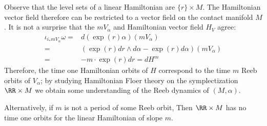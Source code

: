 
 

Observe that the level sets of a linear Hamiltonian are  $\{r\}\times M$. The Hamiltonian vector field therefore can be restricted to a vector field on the contact manifold $M$. It is not a surprise that the $m V_\alpha$ and Hamiltonian vector field $H_V$ agree:
\begin{align*}
    \iota_{i_* m V_\alpha}\omega=& d(\exp(r) \alpha )(m V_\alpha)\\
     =&(\exp(r) dr \wedge d\alpha - \exp(r) d\alpha) (m V_\alpha)\\
    =&- m \cdot \exp(r)dr = dH^m
\end{align*}
Therefore, the time one Hamiltonian orbits of $H$ correspond to the time $m$ Reeb orbits of $V_\alpha$; by studying Hamiltonian Floer theory on the symplectization $\RR\times M$ we obtain some understanding of the Reeb dynamics of $(M, \alpha)$.

Alternatively, if $m$ is not a period of some Reeb orbit, Then $\RR\times M$ has no time one orbits for the linear Hamiltonian of slope $m$. 
 